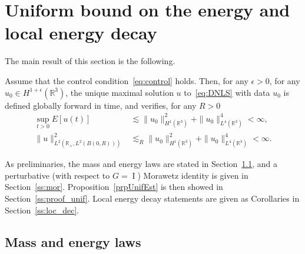 \documentclass[AHL,Unicode,longabstracts,published]{cedram}
\newcommand*\R{\mathbb{R}}
\DeclareMathOperator{\I}{I}
\begin{document}
\section{Uniform bound on the energy and local energy decay}\label{s:nrj}
The main result of this section is the following.

\begin{prop}\label{prpUnifEst}
Assume that the control condition~\eqref{eq:control} holds. Then, for any $\epsilon>0$, for any $u_0 \in H^{1+\epsilon}(\R^3)$, the unique maximal solution $u$ to~\eqref{eq:DNLS} with data $u_0$ is defined globally forward in time, and verifies, for any $R>0$
\begin{align*}
\sup_{t>0} E[u(t)] &\lesssim \| u_0 \|_{H^1(\R^3)}^2 + \| u_0 \|_{L^4(\R^3)}^4 < \infty, \\
\| u \|^2_{L^2(\R_+, L^2(B(0,R)))} &\lesssim_R \| u_0 \|_{H^1(\R^3)}^2 + \| u_0 \|_{L^4(\R^3)}^4 < \infty.
\end{align*}
\end{prop}

As preliminaries, the mass and energy laws are stated in Section~\ref{ss:laws}, and a perturbative (with respect to $G = \I $) Morawetz identity is given in Section~\ref{ss:mor}. Proposition~\ref{prpUnifEst} is then showed in Section~\ref{ss:proof_unif}. Local energy decay statements are given as Corollaries in Section~\ref{ss:loc_dec}.
\subsection{Mass and energy laws} \label{ss:laws}
\end{document}
